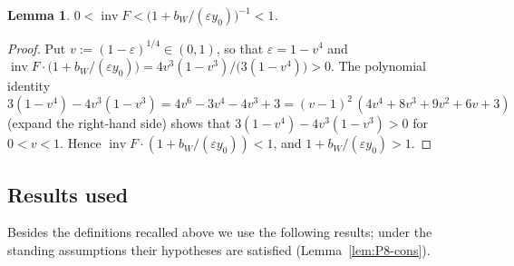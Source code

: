 \documentclass[11pt]{amsart}
\newcommand{\eps}{\varepsilon}
\newcommand{\invF}{\operatorname{inv}F}
\newtheorem{lemma}[theorem]{Lemma}
\theoremstyle{definition}
\theoremstyle{remark}
\numberwithin{equation}{section}
\begin{document}
\begin{lemma}\label{lem:P8-invF}
$0<\invF<\big(1+b_W/(\eps y_0)\big)^{-1}<1$.
\end{lemma}

\begin{proof}
Put $v:=(1-\eps)^{1/4}\in(0,1)$, so that $\eps=1-v^4$ and
$\invF\cdot\big(1+b_W/(\eps y_0)\big)=4v^3(1-v^3)/\big(3(1-v^4)\big)>0$. The polynomial identity
\[
3(1-v^4)-4v^3(1-v^3)=4v^6-3v^4-4v^3+3=(v-1)^2\,(4v^4+8v^3+9v^2+6v+3)
\]
(expand the right-hand side) shows that $3(1-v^4)-4v^3(1-v^3)>0$ for $0<v<1$. Hence
$\invF\cdot(1+b_W/(\eps y_0))<1$, and $1+b_W/(\eps y_0)>1$.
\end{proof}

\subsection{Results used}\label{subsec:P8-used}

Besides the definitions recalled above we use the following results; under the standing assumptions their
hypotheses are satisfied (Lemma~\ref{lem:P8-cons}).
\end{document}
